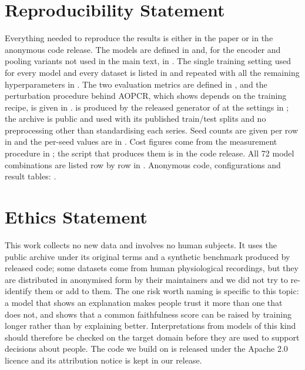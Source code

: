 %

\section*{Reproducibility Statement}

Everything needed to reproduce the results is either in the paper or in the anonymous code release.
The models are defined in  and, for the encoder and pooling variants not used in the
main text, in . The single training setting used for every model and
every dataset is listed in  and repeated with all the remaining hyperparameters in
. The two evaluation metrics are defined in , and the perturbation
procedure behind AOPCR, which  shows depends on the training recipe, is given in
. \webtraffic{} is produced by the released generator of \citet{early2024millet} at
the settings in ; the \ucr{} archive \citep{dau2019ucr} is public and used with its
published train/test splits and no preprocessing other than standardising each series. Seed counts
are given per row in  and the per-seed values are in . Cost figures
come from the measurement procedure in ; the script that produces them is in the code
release. All 72 model combinations are listed row by row in . Anonymous code,
configurations and result tables: \anonrepo{}.

\section*{Ethics Statement}

This work collects no new data and involves no human subjects. It uses the public \ucr{} archive
\citep{dau2019ucr} under its original terms and a synthetic benchmark produced by released code; some
\ucr{} datasets come from human physiological recordings, but they are distributed in anonymised form
by their maintainers and we did not try to re-identify them or add to them. The one risk worth naming
is specific to this topic: a model that shows an explanation makes people trust it more than one that
does not, and  shows that a common faithfulness score can be raised by training
longer rather than by explaining better. Interpretations from models of this kind should therefore be
checked on the target domain before they are used to support decisions about people. The code we
build on is released under the Apache 2.0 licence and its attribution notice is kept in our release.

